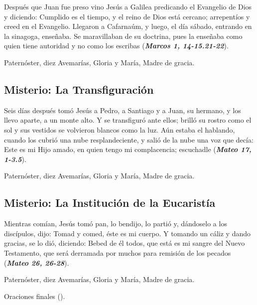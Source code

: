 \documentclass[./main.tex]{subfiles}
\newcounter{lux-counter}
\begin{document}
Después que Juan fue preso vino Jesús a Galilea predicando el Evangelio de Dios y diciendo: Cumplido es el tiempo, 
y el reino de Dios está cercano; arrepentíos y creed en el Evangelio. Llegaron a Cafarnaúm, y luego, el día sábado, 
entrando en la sinagoga, enseñaba. Se maravillaban de su doctrina, pues la enseñaba como quien tiene autoridad y 
no como los escribas (\textbf{\emph{Marcos 1, 14-15.21-22}}).

\begin{center}
      Paternóster, diez Avemarías, Gloria y María, Madre de gracia.
\end{center}

\subsection*{ Misterio: La Transfiguración}

Seis días después tomó Jesús a Pedro, a Santiago y a Juan, su hermano, y los llevo aparte, a un monte alto. 
Y se transfiguró ante ellos; brilló su rostro como el sol y sus vestidos se volvieron blancos como la luz. Aún estaba el hablando, 
cuando los cubrió una nube resplandeciente, y salió de la nube una voz que decía: Este es mi Hijo amado, 
en quien tengo mi complacencia; escuchadle (\textbf{\emph{Mateo 17, 1-3.5}}).

\begin{center}
      Paternóster, diez Avemarías, Gloria y María, Madre de gracia.
\end{center}

\subsection*{ Misterio: La Institución de la Eucaristía}

Mientras comían, Jesús tomó pan, lo bendijo, lo partió y, dándoselo a los discípulos, dijo: Tomad y comed, éste es mi cuerpo. 
Y tomando un cáliz y dando gracias, se lo dió, diciendo: Bebed de él todos, que está es mi sangre del Nuevo Testamento, 
que será derramada por muchos para remisión de los pecados (\textbf{\emph{Mateo 26, 26-28}}).

\begin{center}
      Paternóster, diez Avemarías, Gloria y María, Madre de gracia.
      
      Oraciones finales ().
\end{center}
\end{document}
